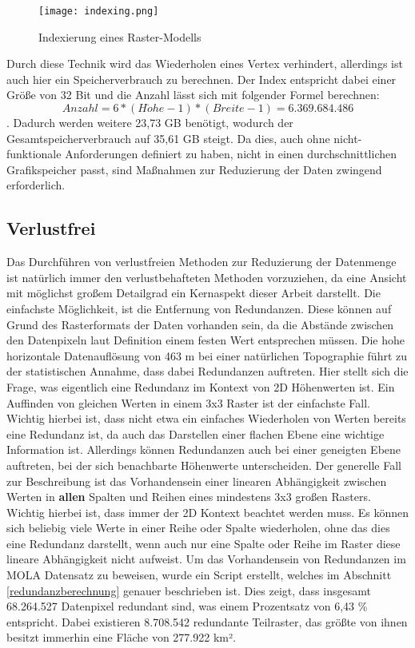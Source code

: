 \begin{figure}[H]
  \texttt{[image: indexing.png]}
  \caption{Indexierung eines Raster-Modells}
  \label{indexing}
\end{figure}

Durch diese Technik wird das Wiederholen eines Vertex verhindert, allerdings ist auch hier ein Speicherverbrauch zu berechnen. Der Index entspricht dabei einer Größe von 32 Bit und die Anzahl lässt sich mit folgender Formel berechnen: \[Anzahl = 6 * (H\ddot{o}he - 1) * (Breite - 1) = 6.369.684.486\]. Dadurch werden weitere 23,73 GB benötigt, wodurch der Gesamtspeicherverbrauch auf 35,61 GB steigt. Da dies, auch ohne nicht-funktionale Anforderungen definiert zu haben, nicht in einen durchschnittlichen Grafikspeicher passt, sind Maßnahmen zur Reduzierung der Daten zwingend erforderlich.

\subsection{Verlustfrei}
Das Durchführen von verlustfreien Methoden zur Reduzierung der Datenmenge ist natürlich immer den verlustbehafteten Methoden vorzuziehen, da eine Ansicht mit möglichst großem Detailgrad ein Kernaspekt dieser Arbeit darstellt. Die einfachste Möglichkeit, ist die Entfernung von Redundanzen. Diese können auf Grund des Rasterformats der Daten vorhanden sein, da die Abstände zwischen den Datenpixeln laut Definition einem festen Wert entsprechen müssen. Die hohe horizontale Datenauflösung von 463 m bei einer natürlichen Topographie führt zu der statistischen Annahme, dass dabei Redundanzen auftreten. Hier stellt sich die Frage, was eigentlich eine Redundanz im Kontext von 2D Höhenwerten ist. Ein Auffinden von gleichen Werten in einem 3x3 Raster ist der einfachste Fall. Wichtig hierbei ist, dass nicht etwa ein einfaches Wiederholen von Werten bereits eine Redundanz ist, da auch das Darstellen einer flachen Ebene eine wichtige Information ist. Allerdings können Redundanzen auch bei einer geneigten Ebene auftreten, bei der sich benachbarte Höhenwerte unterscheiden. Der generelle Fall zur Beschreibung ist das Vorhandensein einer linearen Abhängigkeit zwischen Werten in \textbf{allen} Spalten und Reihen eines mindestens 3x3 großen Rasters\cite{topoDataReduction}. Wichtig hierbei ist, dass immer der 2D Kontext beachtet werden muss. Es können sich beliebig viele Werte in einer Reihe oder Spalte wiederholen, ohne das dies eine Redundanz darstellt, wenn auch nur eine Spalte oder Reihe im Raster diese lineare Abhängigkeit nicht aufweist. Um das Vorhandensein von Redundanzen im MOLA Datensatz zu beweisen, wurde ein Script erstellt, welches im Abschnitt \ref{redundanzberechnung} genauer beschrieben ist. Dies zeigt, dass insgesamt 68.264.527 Datenpixel redundant sind, was einem Prozentsatz von 6,43 \% entspricht. Dabei existieren 8.708.542 redundante Teilraster, das größte von ihnen besitzt immerhin eine Fläche von 277.922 km².

